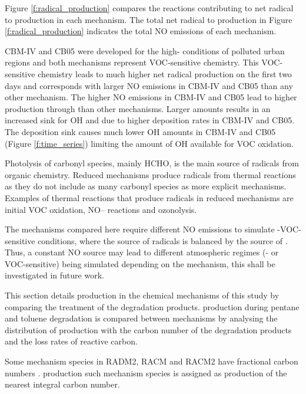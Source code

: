 Figure \ref{f:radical_production} compares the reactions contributing to net radical to  production in each mechanism.
The total net radical to  production in Figure \ref{f:radical_production} indicates the total NO emissions of each mechanism.

CBM-IV and CB05 were developed for the high- conditions of polluted urban regions \citep{Gery:1989, Yarwood:2005} and both mechanisms represent VOC-sensitive chemistry.
This VOC-sensitive chemistry leads to much higher net radical production on the first two days and corresponds with larger NO emissions in CBM-IV and CB05 than any other mechanism.
The higher NO emissions in CBM-IV and CB05 lead to higher  production through  than other mechanisms.
Larger  amounts results in an increased sink for OH and  due to higher  deposition rates in CBM-IV and CB05.
The  deposition sink causes much lower OH amounts in CBM-IV and CB05 (Figure \ref{f:time_series}) limiting the amount of OH available for VOC oxidation.

Photolysis of carbonyl species, mainly HCHO, is the main source of radicals from organic chemistry.
Reduced mechanisms produce radicals from thermal reactions as they do not include as many carbonyl species as more explicit mechanisms. 
Examples of thermal reactions that produce radicals in reduced mechanisms are initial VOC oxidation, NO-- reactions and ozonolysis.

The mechanisms compared here require different NO emissions to simulate -VOC-sensitive conditions, where the source of radicals is balanced by the source of .
Thus, a constant NO source may lead to different atmospheric regimes (- or VOC-sensitive) being simulated depending on the mechanism, this shall be investigated in future work.

This section details  production in the chemical mechanisms of this study by comparing the treatment of the degradation products.
 production during pentane and toluene degradation is compared between mechanisms by analysing the distribution of  production with the carbon number of the degradation products and the loss rates of reactive carbon.

Some mechanism species in RADM2, RACM and RACM2 have fractional carbon numbers \citep{Stockwell:1990, Stockwell:1997, Goliff:2013}.
 production such mechanism species is assigned as  production of the nearest integral carbon number.

